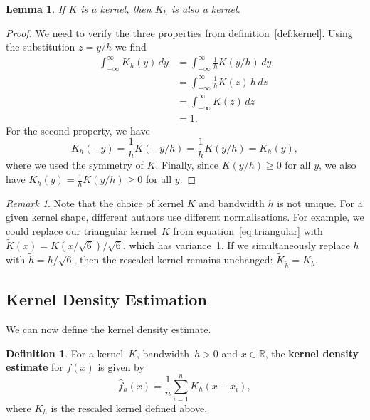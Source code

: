 \documentclass[
  a4paper,
]{article}
\newtheorem{lemma}{Lemma}[section]
\theoremstyle{definition}
\newtheorem{definition}{Definition}[section]
\theoremstyle{definition}
\theoremstyle{definition}
\theoremstyle{definition}
\theoremstyle{remark}
\newtheorem*{remark}{Remark}
\begin{document}
\begin{lemma}
\protect\hypertarget{lem:Kh-kernel}{}\label{lem:Kh-kernel}If \(K\) is a kernel, then \(K_h\) is also a kernel.
\end{lemma}

\begin{proof}
We need to verify the three properties from definition~\ref{def:kernel}.
Using the substitution \(z = y/h\) we find
\begin{align*}
  \int_{-\infty}^\infty K_h(y) \,dy
  &= \int_{-\infty}^\infty \frac{1}{h} K(y/h) \,dy \\
  &= \int_{-\infty}^\infty \frac{1}{h} K(z) \,h \,dz \\
  &= \int_{-\infty}^\infty K(z) \,dz \\
  &= 1.
\end{align*}
For the second property, we have
\begin{equation*}
  K_h(-y)
  = \frac{1}{h} K(-y/h)
  = \frac{1}{h} K(y/h)
  = K_h(y),
\end{equation*}
where we used the symmetry of \(K\).
Finally, since \(K(y/h) \geq 0\) for all \(y\), we also have \(K_h(y) = \frac{1}{h} K(y/h) \geq 0\)
for all \(y\).
\end{proof}

\begin{remark}
Note that the choice of kernel \(K\) and bandwidth \(h\) is not unique. For a given
kernel shape, different authors use different normalisations. For example, we
could replace our triangular kernel~\(K\) from equation~\eqref{eq:triangular}
with \(\tilde K(x) = K(x/\sqrt{6}) / \sqrt{6}\), which has variance~1. If we
simultaneously replace \(h\) with \(\tilde h = h/\sqrt{6}\), then the rescaled
kernel remains unchanged: \(\tilde K_{\tilde h} = K_h\).
\end{remark}

\subsection{Kernel Density Estimation}\label{kernel-density-estimation}

We can now define the kernel density estimate.

\begin{definition}
\protect\hypertarget{def:KDE}{}\label{def:KDE}For a kernel~\(K\), bandwidth~\(h > 0\) and \(x \in \mathbb{R}\), the
\textbf{kernel density estimate} for \(f(x)\) is given by
\begin{equation*}
  \hat f_h(x)
  = \frac{1}{n} \sum_{i=1}^n K_h(x - x_i),
\end{equation*}
where \(K_h\) is the rescaled kernel defined above.
\end{definition}
\end{document}
